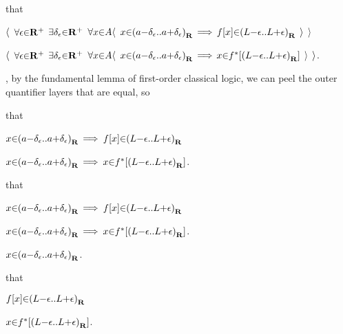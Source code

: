 \hs\hs \par
\hs\hs {}  that \par
\hs\hs $\a\langle$ $\a\forall \epsilon \p\in \R^+$ $\a\exists \delta_\epsilon \p\in \R^+$ $\a\forall x \p\in A \a\langle$ $x \p\in \a(a\p-\delta_\epsilon \a{..} a\p+\delta_\epsilon\a)_\R$ $\a\lthen$ $f[x] \p\in \a(L\p-\epsilon \a{..} L\p+\epsilon\a)_\R$ $\a\rangle$ $\a\rangle$ \par
\hs\hs {} \par
\hs\hs $\a\langle$ $\a\forall \epsilon \p\in \R^+$ $\a\exists \delta_\epsilon \p\in \R^+$ $\a\forall x \p\in A \a\langle$ $x \p\in \a(a\p-\delta_\epsilon \a{..} a\p+\delta_\epsilon\a)_\R$ $\a\lthen$ $x \p\in f^*[\a(L\p-\epsilon \a{..} L\p+\epsilon\a)_\R]$ $\a\rangle$ $\a\rangle$. \par
\hs\hs {}, by the fundamental lemma of first-order classical logic, we can peel the outer quantifier layers that are equal, so \par
\hs\hs {} that \par
\hs\hs $x \p\in \a(a\p-\delta_\epsilon \a{..} a\p+\delta_\epsilon\a)_\R$ $\a\lthen$ $f[x] \p\in \a(L\p-\epsilon \a{..} L\p+\epsilon\a)_\R$ \par
\hs\hs {} \par
\hs\hs $x \p\in \a(a\p-\delta_\epsilon \a{..} a\p+\delta_\epsilon\a)_\R$ $\a\lthen$ $x \p\in f^*[\a(L\p-\epsilon \a{..} L\p+\epsilon\a)_\R]$. \par
\hs\hs {} that \par
\hs\hs $x \p\in \a(a\p-\delta_\epsilon \a{..} a\p+\delta_\epsilon\a)_\R$ $\a\lthen$ $f[x] \p\in \a(L\p-\epsilon \a{..} L\p+\epsilon\a)_\R$ \par
\hs\hs {} \par
\hs\hs $x \p\in \a(a\p-\delta_\epsilon \a{..} a\p+\delta_\epsilon\a)_\R$ $\a\lthen$ $x \p\in f^*[\a(L\p-\epsilon \a{..} L\p+\epsilon\a)_\R]$. \par

\hs\hs\hs \par
\hs\hs\hs {} $x \p\in \a(a\p-\delta_\epsilon \a{..} a\p+\delta_\epsilon\a)_\R$. \par
\hs\hs\hs {} that \par
\hs\hs\hs $f[x] \p\in \a(L\p-\epsilon \a{..} L\p+\epsilon\a)_\R$ \par
\hs\hs\hs {} \par
\hs\hs\hs $x \p\in f^*[\a(L\p-\epsilon \a{..} L\p+\epsilon\a)_\R]$. \par

